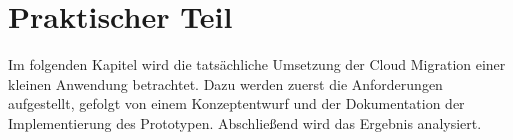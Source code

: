 \chapter{Praktischer Teil}

Im folgenden Kapitel wird die tatsächliche Umsetzung der Cloud Migration einer kleinen Anwendung betrachtet.
Dazu werden zuerst die Anforderungen aufgestellt, gefolgt von einem Konzeptentwurf und der Dokumentation der
Implementierung des Prototypen. Abschließend wird das Ergebnis analysiert.





